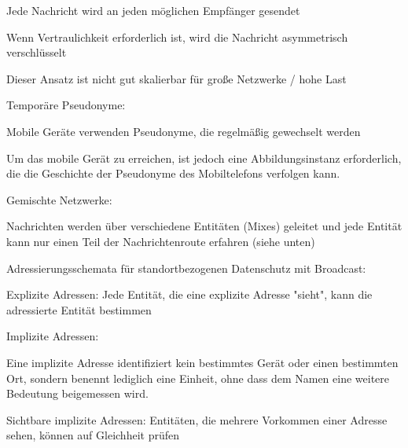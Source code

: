 \documentclass[a4paper]{article}
\begin{document}
\begin{multicols}{3}
\begin{itemize*}
\begin{itemize*}
                  \begin{itemize*}
                        \item Jede Nachricht wird an jeden möglichen Empfänger gesendet
                        \item Wenn Vertraulichkeit erforderlich ist, wird die Nachricht asymmetrisch verschlüsselt
                        \item Dieser Ansatz ist nicht gut skalierbar für große Netzwerke / hohe Last
                  \end{itemize*}
                  \item Temporäre Pseudonyme:
                  \begin{itemize*}
                        \item Mobile Geräte verwenden Pseudonyme, die regelmäßig gewechselt werden
                        \item Um das mobile Gerät zu erreichen, ist jedoch eine Abbildungsinstanz erforderlich, die die Geschichte der Pseudonyme des Mobiltelefons verfolgen kann.
                  \end{itemize*}
                  \item Gemischte Netzwerke:
                  \begin{itemize*}
                        \item Nachrichten werden über verschiedene Entitäten (Mixes) geleitet und jede Entität kann nur einen Teil der Nachrichtenroute erfahren (siehe unten)
                  \end{itemize*}
            \end{itemize*}
            \item Adressierungsschemata für standortbezogenen Datenschutz mit Broadcast:
            \begin{itemize*}
                  \item Explizite Adressen: Jede Entität, die eine explizite Adresse "sieht", kann die adressierte Entität bestimmen
            \end{itemize*}
            \item Implizite Adressen:
            \begin{itemize*}
                  \item Eine implizite Adresse identifiziert kein bestimmtes Gerät oder einen bestimmten Ort, sondern benennt lediglich eine Einheit, ohne dass dem Namen eine weitere Bedeutung beigemessen wird.
                  \item Sichtbare implizite Adressen: Entitäten, die mehrere Vorkommen einer Adresse sehen, können auf Gleichheit prüfen

\end{itemize*}
\end{itemize*}
\end{multicols}
\end{document}
